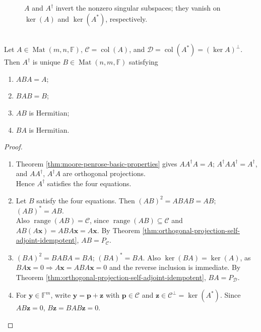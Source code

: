 \begin{figure}[H]
  \centering
  
  \caption{$A$ and $A^{\dagger}$ invert the nonzero singular subspaces; they vanish on $\ker(A)$ and $\ker(A^*)$, respectively.}
  \label{fig:pseudoinverse-four-spaces}
\end{figure}

\begin{theorem} \label{thm:penrose-equations-characterize-pseudoinverse} \\
Let $A\in\operatorname{Mat}(m,n,\mathbb{F})$, $\mathcal{C}=\operatorname{col}(A)$, and $\mathcal{D}=\operatorname{col}(A^*)=(\ker A)^{\perp}$. Then $A^{\dagger}$ is unique $B\in\operatorname{Mat}(n,m,\mathbb{F})$ satisfying
\begin{enumerate}[label=(\roman*)]
\setlength{\itemsep}{0pt}
\item $ABA=A$;
\item $BAB=B$;
\item $AB$ is Hermitian;
\item $BA$ is Hermitian.
\end{enumerate}
\begin{proof}
\begin{enumerate}[label=(\roman*)]
\setlength{\itemsep}{0pt}
\item Theorem \ref{thm:moore-penrose-basic-properties} gives $AA^{\dagger}A=A$; $A^{\dagger}AA^{\dagger}=A^{\dagger}$, and $AA^{\dagger}$, $A^{\dagger}A$ are orthogonal projections.\\
Hence $A^{\dagger}$ satisfies the four equations.
\item Let $B$ satisfy the four equations. Then $(AB)^2=ABAB=AB$; $(AB)^*=AB$.\\
Also $\operatorname{range}(AB)=\mathcal{C}$, since $\operatorname{range}(AB)\subseteq\mathcal{C}$ and $AB(A\mathbf{x})=ABA\mathbf{x}=A\mathbf{x}$. By Theorem \ref{thm:orthogonal-projection-self-adjoint-idempotent}, $AB=P_{\mathcal{C}}$.
\item $(BA)^2=BABA=BA$; $(BA)^*=BA$. Also $\ker(BA)=\ker(A)$, as $BA\mathbf{x}=0\Rightarrow A\mathbf{x}=ABA\mathbf{x}=0$ and the reverse inclusion is immediate. By Theorem \ref{thm:orthogonal-projection-self-adjoint-idempotent}, $BA=P_{\mathcal{D}}$.
\item For $\mathbf{y}\in\mathbb{F}^m$, write $\mathbf{y}=\mathbf{p}+\mathbf{z}$ with $\mathbf{p}\in\mathcal{C}$ and $\mathbf{z}\in\mathcal{C}^{\perp}=\ker(A^*)$. Since $AB\mathbf{z}=0$, $B\mathbf{z}=BAB\mathbf{z}=0$.\\

\end{enumerate}
\end{proof}
\end{theorem}
